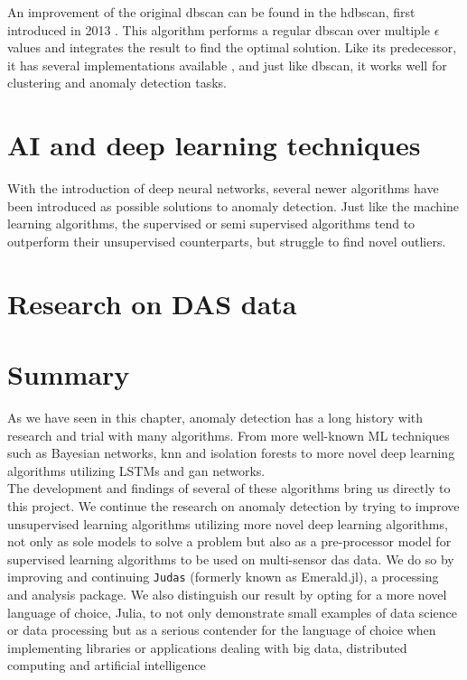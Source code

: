 An improvement of the original \acrshort{dbscan} can be found in the \acrfull{hdbscan}, first introduced in 2013 \cite{10.1007/978-3-642-37456-2_14}. This algorithm performs a regular dbscan over multiple $\epsilon$ values and integrates the result to find the optimal solution. Like its predecessor, it has several implementations available \cite{McInnes2017}, and just like dbscan, it works well for clustering and anomaly detection tasks. \\




\section{AI and deep learning techniques}

With the introduction of deep neural networks, several newer algorithms have been introduced as possible solutions to anomaly detection. Just like the machine learning algorithms, the supervised or semi supervised algorithms tend to outperform their unsupervised counterparts, but struggle to find novel outliers. 

\section{Research on DAS data}


\section{Summary}

As we have seen in this chapter, anomaly detection has a long history with research and trial with many algorithms. From more well-known ML techniques such as Bayesian networks, knn and isolation forests to more novel deep learning algorithms utilizing LSTMs and \acrshort{gan} networks. \\

The development and findings of several of these algorithms bring us directly to this project. We continue the research on anomaly detection by trying to improve unsupervised learning algorithms utilizing more novel deep learning algorithms, not only as sole models to solve a problem but also as a pre-processor model for supervised learning algorithms to be used on multi-sensor das data. We do so by improving and continuing \texttt{Judas} (formerly known as Emerald.jl), a processing and analysis package. We also distinguish our result by opting for a more novel language of choice, Julia, to not only demonstrate small examples of data science or data processing but as a serious contender for the language of choice when implementing libraries or applications dealing with big data, distributed computing and artificial intelligence







